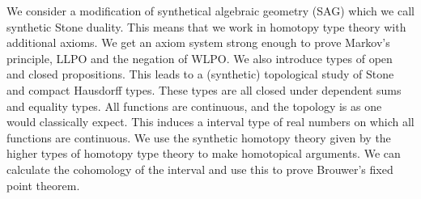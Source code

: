 We consider a modification of synthetical algebraic geometry (SAG) which we call synthetic Stone duality.
This means that we work in homotopy type theory with additional axioms.
We get an axiom system strong enough to prove Markov's principle, LLPO and the negation of WLPO. 
We also introduce types of open and closed propositions. 
This leads to a (synthetic) topological study of Stone and compact Hausdorff types. 
These types are all closed under dependent sums and equality types. 
All functions are continuous, and the topology is as one would classically expect.
This induces a interval type of real numbers on which all functions are continuous.
We use the synthetic homotopy theory given by the higher types of homotopy type theory to make homotopical arguments.
We can calculate the cohomology of the interval and use this to prove Brouwer's fixed point theorem. 
